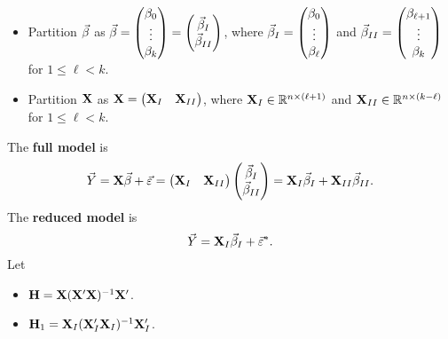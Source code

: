 \begin{itemize}
    \item Partition $ \vec{\beta} $ as
          $ \vec{\beta}=\begin{pmatrix}
                  \beta_0 \\
                  \vdots  \\
                  \beta_k
              \end{pmatrix}=\begin{pmatrix}
                  \vec{\beta}_I \\
                  \vec{\beta}_{II}
              \end{pmatrix} $,
          where
          $ \vec{\beta}_I=\begin{pmatrix}
                  \beta_0 \\
                  \vdots  \\
                  \beta_\ell
              \end{pmatrix} $ and $ \vec{\beta}_{II}=\begin{pmatrix}
                  \beta_{\ell+1} \\
                  \vdots         \\
                  \beta_{k}
              \end{pmatrix}$ for $ 1\le \ell<k $.
    \item Partition $ \mathbf{X} $ as $ \mathbf{X}=\begin{pmatrix}
                  \mathbf{X}_I & \mathbf{X}_{II}
              \end{pmatrix} $, where $ \mathbf{X}_I\in\mathbb{R}^{n\times (\ell+1)} $
          and $ \mathbf{X}_{II}\in\mathbb{R}^{n\times(k-\ell)} $ for $ 1\le \ell<k $.
\end{itemize}
The \textbf{full model} is
\[ \vec{Y}=\mathbf{X}\vec{\beta}+\vec{\varepsilon}=
    \begin{pmatrix}
        \mathbf{X}_{I} & \mathbf{X}_{II}
    \end{pmatrix}\begin{pmatrix}
        \vec{\beta}_I \\
        \vec{\beta}_{II}
    \end{pmatrix}=\mathbf{X}_I \vec{\beta}_I+\mathbf{X}_{II}\vec{\beta}_{II}. \]
The \textbf{reduced model} is
\[ \vec{Y}=\mathbf{X}_I \vec{\beta}_I+\vec{\varepsilon}^*. \]
Let
\begin{itemize}
    \item $ \mathbf{H}=\mathbf{X}(\mathbf{X}'\mathbf{X})^{-1}\mathbf{X}' $.
    \item $ \mathbf{H}_1=\mathbf{X}_I(\mathbf{X}_I'\mathbf{X}_I)^{-1}\mathbf{X}_I' $.
\end{itemize}

